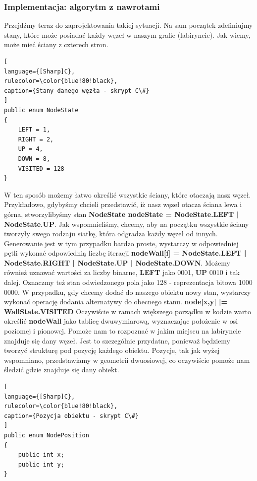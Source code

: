 \documentclass[oneside,polski,logo]{amuthesis}
\begin{document}
\subsubsection{Implementacja: algorytm z nawrotami}
\par Przejdźmy teraz do zaprojektowania takiej sytuacji. Na sam początek zdefiniujmy stany, które może posiadać każdy węzeł w naszym grafie (labiryncie). Jak wiemy, może mieć ściany z czterech stron. 
\begin{lstlisting}[
language={[Sharp]C},
rulecolor=\color{blue!80!black},
caption={Stany danego węzła - skrypt C\#}
]
public enum NodeState
{
    LEFT = 1,
    RIGHT = 2,
    UP = 4,
    DOWN = 8,
    VISITED = 128
}
\end{lstlisting}
W ten sposób możemy łatwo określić wszystkie ściany, które otaczają nasz węzeł. Przykładowo, gdybyśmy chcieli przedstawić, iż nasz węzeł otacza ściana lewa i górna, stworzylibyśmy stan \textbf{NodeState nodeState = NodeState.LEFT | NodeState.UP}. Jak wspomnieliśmy, chcemy, aby na początku wszystkie ściany tworzyły swego rodzaju siatkę, która odgradza każdy węzeł od innych. Generowanie jest w tym przypadku bardzo proste, wystarczy w odpowiedniej pętli wykonać odpowiednią liczbę iteracji \textbf{nodeWall[i] = NodeState.LEFT | NodeState.RIGHT | NodeState.UP | NodeState.DOWN}. Możemy również uznawać wartości za liczby binarne, \textbf{LEFT} jako 0001, \textbf{UP} 0010 i tak dalej. Oznaczmy też stan odwiedzonego pola jako 128 - reprezentacja bitowa 1000 0000. W przypadku, gdy chcemy dodać do naszego obiektu nowy stan, wystarczy wykonać operację dodania alternatywy do obecnego stanu. \textbf{node[x,y] |= WallState.VISITED} Oczywiście w ramach większego porządku w kodzie warto określić \textbf{nodeWall} jako tablicę dwuwymiarową, wyznaczając położenie w osi poziomej i pionowej. Pomoże nam to rozpoznać w jakim miejscu na labiryncie znajduje się dany węzeł. Jest to szczególnie przydatne, ponieważ będziemy tworzyć strukturę pod pozycję każdego obiektu. Pozycje, tak jak wyżej wspomniano, przedstawiamy w geometrii dwuosiowej, co oczywiście pomoże nam śledzić gdzie znajduje się dany obiekt. 
\begin{lstlisting}[
language={[Sharp]C},
rulecolor=\color{blue!80!black},
caption={Pozycja obiektu - skrypt C\#}
]
public enum NodePosition
{
	public int x;
	public int y;
}
\end{lstlisting}
\end{document}
